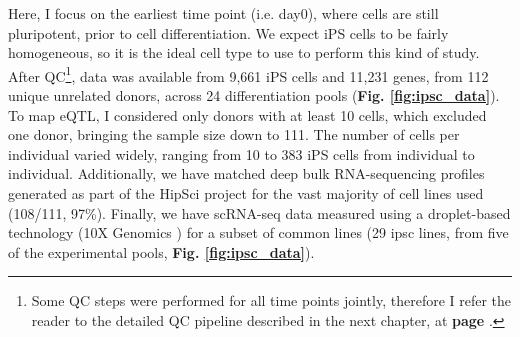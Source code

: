 Here,
I focus on the earliest time point (i.e. day0), where cells are still pluripotent, prior to cell differentiation.
We expect iPS cells to be fairly homogeneous, so it is the ideal cell type to use to perform this kind of study.
After QC\footnote{Some QC steps were performed for all time points jointly, therefore I refer the reader to the detailed QC pipeline described in the next chapter, at \textbf{page \pageref{fig:endodiff_qc_workflow}}.}, data was available from 9,661 iPS cells and 11,231 genes, from 112 unique unrelated donors, across 24 differentiation pools (\textbf{Fig. \ref{fig:ipsc_data}}). 
To map eQTL, I considered only donors with at least 10 cells, which excluded one donor, bringing the sample size down to 111.
The number of cells per individual varied widely, ranging from 10 to 383 iPS cells from individual to individual.
Additionally, we have matched deep bulk RNA-sequencing profiles generated as part of the HipSci project \cite{kilpinen2017common} for the vast majority of cell lines used (108/111, 97\%). 
Finally, we have scRNA-seq data measured using a droplet-based technology (10X Genomics \cite{zheng2017massively}) for a subset of common lines (29 \gls{ipsc} lines, from five of the experimental pools, \textbf{Fig. \ref{fig:ipsc_data}}). 

